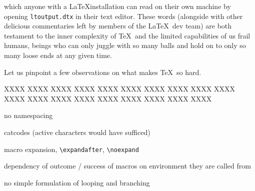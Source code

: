 which anyone with a \LaTeX installation can read on their own machine by opening \verb#ltoutput.dtx# in
their text editor. These words (alongside with other delicious commentaries left by members of the \LaTeX\
dev team) are both testament to the inner complexity of \TeX\ and the limited capabilities of us frail
humans, beings who can only juggle with so many balls and hold on to only so many loose ends at any given time.



Let us pinpoint a few observations on what makes \TeX\ so hard.

XXXX XXXX XXXX XXXX XXXX XXXX XXXX XXXX XXXX XXXX XXXX XXXX XXXX XXXX XXXX XXXX XXXX XXXX XXXX

no namespacing

catcodes (active characters would have sufficed)

macro expansion,
\verb#\expandafter#, \verb#\noexpand#

dependency of outcome / success of macros on environment they are called from

no simple formulation of looping and branching





\endgroup
